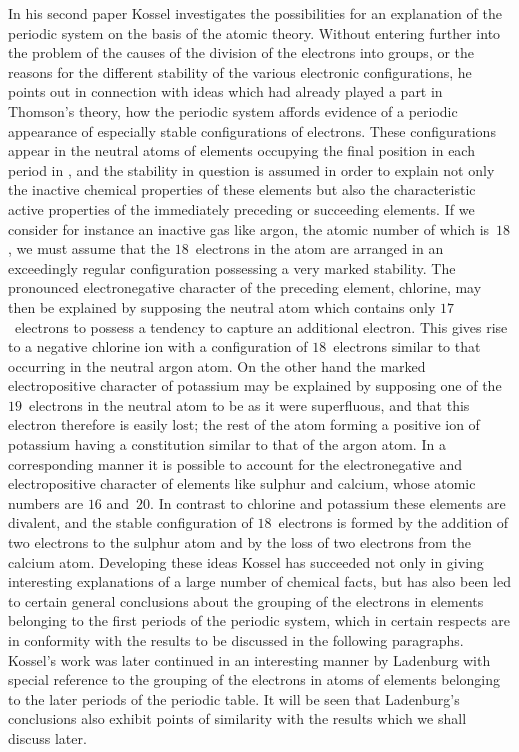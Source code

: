 In his second paper Kossel investigates the possibilities for an
explanation of the periodic system on the basis of the atomic theory.
Without entering further into the problem of the causes of the
division of the electrons into groups, or the reasons for the different
stability of the various electronic configurations, he points out in
connection with ideas which had already played a part in Thomson's
theory, how the periodic system affords evidence of a periodic appearance
of especially stable configurations of electrons. These configurations
appear in the neutral atoms of elements occupying the
final position in each period in , and the stability in question is
assumed in order to explain not only the inactive chemical properties
of these elements but also the characteristic active properties of the
immediately preceding or succeeding elements. If we consider for
instance an inactive gas like argon, the atomic number of which is~$18$,
we must assume that the $18$~electrons in the atom are arranged in
an exceedingly regular configuration possessing a very marked
stability. The pronounced electronegative character of the preceding
element, chlorine, may then be explained by supposing the neutral
atom which contains only $17$~electrons to possess a tendency to
capture an additional electron. This gives rise to a negative chlorine
ion with a configuration of $18$~electrons similar to that occurring
in the neutral argon atom. On the other hand the marked electropositive
character of potassium may be explained by supposing
one of the $19$~electrons in the neutral atom to be as it were superfluous,
and that this electron therefore is easily lost; the rest of the
atom forming a positive ion of potassium having a constitution similar
to that of the argon atom. In a corresponding manner it is possible
to account for the electronegative and electropositive character of
elements like sulphur and calcium, whose atomic numbers are $16$ and~$20$.
In contrast to chlorine and potassium these elements are divalent,
and the stable configuration of $18$~electrons is formed by the addition
of two electrons to the sulphur atom and by the loss of two electrons
from the calcium atom. Developing these ideas Kossel has succeeded
not only in giving interesting explanations of a large number of
chemical facts, but has also been led to certain general conclusions
about the grouping of the electrons in elements belonging to the
first periods of the periodic system, which in certain respects are
in conformity with the results to be discussed in the following
paragraphs. Kossel's work was later continued in an interesting
manner by Ladenburg with special reference to the grouping of the
electrons in atoms of elements belonging to the later periods of the
periodic table. It will be seen that Ladenburg's conclusions also
exhibit points of similarity with the results which we shall discuss
later.

